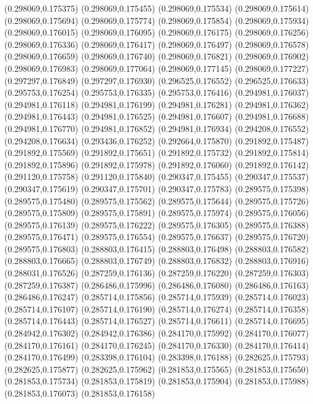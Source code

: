(0.298069,0.175375)
(0.298069,0.175455)
(0.298069,0.175534)
(0.298069,0.175614)
(0.298069,0.175694)
(0.298069,0.175774)
(0.298069,0.175854)
(0.298069,0.175934)
(0.298069,0.176015)
(0.298069,0.176095)
(0.298069,0.176175)
(0.298069,0.176256)
(0.298069,0.176336)
(0.298069,0.176417)
(0.298069,0.176497)
(0.298069,0.176578)
(0.298069,0.176659)
(0.298069,0.176740)
(0.298069,0.176821)
(0.298069,0.176902)
(0.298069,0.176983)
(0.298069,0.177064)
(0.298069,0.177145)
(0.298069,0.177227)
(0.297297,0.176849)
(0.297297,0.176930)
(0.296525,0.176552)
(0.296525,0.176633)
(0.295753,0.176254)
(0.295753,0.176335)
(0.295753,0.176416)
(0.294981,0.176037)
(0.294981,0.176118)
(0.294981,0.176199)
(0.294981,0.176281)
(0.294981,0.176362)
(0.294981,0.176443)
(0.294981,0.176525)
(0.294981,0.176607)
(0.294981,0.176688)
(0.294981,0.176770)
(0.294981,0.176852)
(0.294981,0.176934)
(0.294208,0.176552)
(0.294208,0.176634)
(0.293436,0.176252)
(0.292664,0.175870)
(0.291892,0.175487)
(0.291892,0.175569)
(0.291892,0.175651)
(0.291892,0.175732)
(0.291892,0.175814)
(0.291892,0.175896)
(0.291892,0.175978)
(0.291892,0.176060)
(0.291892,0.176142)
(0.291120,0.175758)
(0.291120,0.175840)
(0.290347,0.175455)
(0.290347,0.175537)
(0.290347,0.175619)
(0.290347,0.175701)
(0.290347,0.175783)
(0.289575,0.175398)
(0.289575,0.175480)
(0.289575,0.175562)
(0.289575,0.175644)
(0.289575,0.175726)
(0.289575,0.175809)
(0.289575,0.175891)
(0.289575,0.175974)
(0.289575,0.176056)
(0.289575,0.176139)
(0.289575,0.176222)
(0.289575,0.176305)
(0.289575,0.176388)
(0.289575,0.176471)
(0.289575,0.176554)
(0.289575,0.176637)
(0.289575,0.176720)
(0.289575,0.176803)
(0.288803,0.176415)
(0.288803,0.176498)
(0.288803,0.176582)
(0.288803,0.176665)
(0.288803,0.176749)
(0.288803,0.176832)
(0.288803,0.176916)
(0.288031,0.176526)
(0.287259,0.176136)
(0.287259,0.176220)
(0.287259,0.176303)
(0.287259,0.176387)
(0.286486,0.175996)
(0.286486,0.176080)
(0.286486,0.176163)
(0.286486,0.176247)
(0.285714,0.175856)
(0.285714,0.175939)
(0.285714,0.176023)
(0.285714,0.176107)
(0.285714,0.176190)
(0.285714,0.176274)
(0.285714,0.176358)
(0.285714,0.176443)
(0.285714,0.176527)
(0.285714,0.176611)
(0.285714,0.176695)
(0.284942,0.176302)
(0.284942,0.176386)
(0.284170,0.175992)
(0.284170,0.176077)
(0.284170,0.176161)
(0.284170,0.176245)
(0.284170,0.176330)
(0.284170,0.176414)
(0.284170,0.176499)
(0.283398,0.176104)
(0.283398,0.176188)
(0.282625,0.175793)
(0.282625,0.175877)
(0.282625,0.175962)
(0.281853,0.175565)
(0.281853,0.175650)
(0.281853,0.175734)
(0.281853,0.175819)
(0.281853,0.175904)
(0.281853,0.175988)
(0.281853,0.176073)
(0.281853,0.176158)
